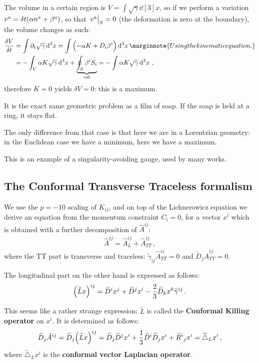 \documentclass[main.tex]{subfiles}
\begin{document}
The volume in a certain region is \(V = \int \sqrt{\gamma } \dd[3]{x}\), so if we perform a variation \(v^{a} = \delta t \qty(\alpha n^a + \beta^{a})\), so that \(\eval{v^{a}}_{S} = 0\) (the deformation is zero at the boundary), the volume changes as such: 
%
\begin{align}
\fdv{V}{t} &= \int \partial_{t} \sqrt{\gamma } \dd[3]{x}
= \int \qty(- \alpha K + D_i \beta^{i}) \dd[3]{x}
\marginnote{Using the kinematic equation.}  \\
&= - \int_V \alpha K \sqrt{\gamma } \dd[3]{x} + \underbrace{\oint_S \beta^{i} S_i}_{= 0}
= - \int \alpha K \sqrt{\gamma } \dd[3]{x}
\,,
\end{align}
%
therefore \(K = 0\) yields \(\delta V = 0\): this is a maximum.

It is the exact same geometric problem as a film of soap. 
If the soap is held at a ring, it stays flat. 

The only difference from that case is that here we are in a Lorentzian geometry: in the Euclidean case we have a minimum, here we have a maximum. 

This is an example of a singularity-avoiding gauge, used by many works. 

\subsection{The Conformal Transverse Traceless formalism}

We use the \(p = -10\) scaling of \(K_{ij}\), and on top of the Lichnerowicz equation we derive an equation from the momentum constraint \(C_i = 0\), for a vector \(x^{i}\) which is obtained with a further decomposition of \(\hat{A}^{ij}\): 
%
\begin{align}
\hat{A}^{ij} = \hat{A}^{ij}_L + \hat{A}^{ij}_{TT}
\,,
\end{align}
%
where the TT part is transverse and traceless: \(\widetilde{\gamma}_{ij} \hat{A}^{ij}_{TT} = 0\) and \(\widetilde{D}_j \hat{A}^{ij}_{TT} = 0\).

The longitudinal part on the other hand is expressed as follows: 
%
\begin{align}
\qty(\widetilde{L} x)^{ij} = \widetilde{D}^{i} x^{j} + \widetilde{D}^{j} x^{i} - \frac{2}{3} \widetilde{D}_k x^{k} \widetilde{\gamma}^{ij}
\,.
\end{align}

This seems like a rather strange expression: \(\widetilde{L}\) is called the \textbf{Conformal Killing operator} on \(x^{i}\). 
It is determined as follows: 
%
\begin{align}
\widetilde{D}_j  \hat{A}^{ij} = 
\widetilde{D}_j  \qty(\widetilde{L} x)^{ij} 
= \widetilde{D}_j  \widetilde{D}^{j} x^{i} 
+ \frac{1}{3} \widetilde{D}^{i} \widetilde{D}_j x^{i} + \widetilde{R}^{i}{}_j x^{i} = \widetilde{\triangle}_L x^{i} 
\,,
\end{align}
%
where \(\widetilde{\triangle}_L x^{i}\) is the \textbf{conformal vector Laplacian operator}. 
\end{document}
